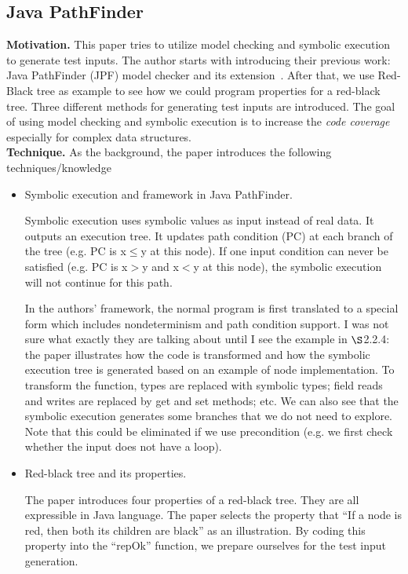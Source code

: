 \documentclass[12pt]{article}
\begin{document}
\subsection{Java PathFinder}
\label{sec:review:pathfinder}

\textbf{Motivation.} This paper tries to utilize model checking and symbolic execution to generate test inputs. The author starts with introducing their previous work: Java PathFinder (JPF) model checker and its extension~\cite{khurshid2003generalized}. After that, we use Red-Black tree as example to see how we could program properties for a red-black tree. Three different methods for generating test inputs are introduced. The goal of using model checking and symbolic execution is to increase the \textit{code coverage} especially for complex data structures.
\\

\noindent
\textbf{Technique.}
As the background, the paper introduces the following techniques/knowledge
\begin{itemize}
\item Symbolic execution and framework in Java PathFinder.

Symbolic execution uses symbolic values as input instead of real data. It outputs an execution tree. It updates path condition (PC) at each branch of the tree (e.g. PC is x$\leq$y at this node). If one input condition can never be satisfied (e.g. PC is x$>$y and x$<$y at this node), the symbolic execution will not continue for this path.

In the authors' framework, the normal program is first translated to a special form which includes nondeterminism and path condition support. I was not sure what exactly they are talking about until I see the example in $\S$2.2.4: the paper illustrates how the code is transformed and how the symbolic execution tree is generated based on an example of node implementation.
To transform the function, types are replaced with symbolic types; field reads and writes are replaced by get and set methods; etc. We can also see that the symbolic execution generates some branches that we do not need to explore. Note that this could be eliminated if we use precondition (e.g. we first check whether the input does not have a loop).


\item Red-black tree and its properties.

The paper introduces four properties of a red-black tree. They are all expressible in Java language. The paper selects the property that ``If a node is red, then both its children are black'' as an illustration. By coding this property into the ``repOk'' function, we prepare ourselves for the test input generation. 
\end{itemize}
\end{document}
